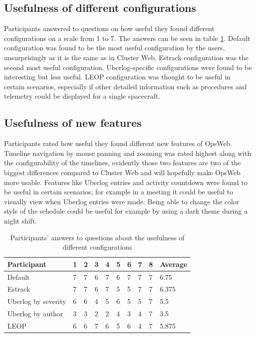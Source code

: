 \subsection{Usefulness of different configurations}
Participants answered to questions on how useful they found different configurations on a scale from 1 to 7. The answers can be seen in table \ref{config_usefulness}. Default configuration was found to be the most useful configuration by the users, unsurprisingly as it is the same as in Cluster Web. Estrack configuration was the second most useful configuration. Uberlog-specific configurations were found to be interesting but less useful. LEOP configuration was thought to be useful in certain scenarios, especially if other detailed information such as procedures and telemetry could be displayed for a single spacecraft.

\subsection{Usefulness of new features}
Participants rated how useful they found different new features of OpsWeb. Timeline navigation by mouse panning and zooming was rated highest along with the configurability of the timelines, evidently those two features are two of the biggest differences compared to Cluster Web and will hopefully make OpsWeb more usable. Features like Uberlog entries and activity countdown were found to be useful in certain scenarios; for example in a meeting it could be useful to visually view when Uberlog entries were made. Being able to change the color style of the schedule could be useful for example by using a dark theme during a night shift.

\begin{table}[!h]
\def\arraystretch{1.1}%
    \begin{center}
    \caption{Participants' answers to questions about the usefulness of different configurations}
    \label{config_usefulness}
    \begin{tabular}{| l | l | l | l | l | l | l | l | l | l | }
    \hline
    Participant & 1 & 2 & 3 & 4 & 5 & 6 & 7 & 8 & Average  \\
    \hline
    Default    & 7  & 7 & 6 & 7 & 6 & 7 & 7 & 7 & 6.75   \\
    Estrack    & 7  & 7 & 6 & 7 & 5 & 5 & 7 & 7 & 6.375   \\
    Uberlog by severity    & 6  & 6 & 4 & 5 & 6 & 5 & 5 & 7 & 5.5   \\
    Uberlog by author    & 3  & 3 & 2 & 2 & 4 & 3 & 4 & 7 & 3.5   \\
    LEOP    & 6  & 6 & 7 & 6 & 5 & 6 & 4 & 7 & 5.875   \\
    \hline
    \end{tabular}
    \end{center}
\end{table}


